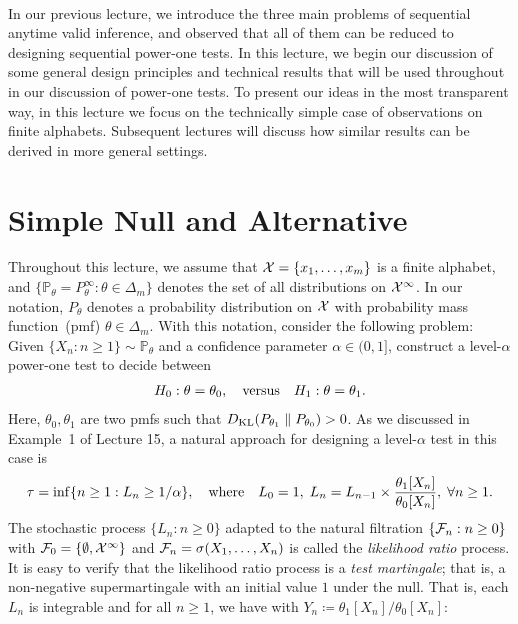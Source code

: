 \documentclass[12pt]{article}
\begin{document}
	\MakeScribeTop
{} \\
In our previous lecture, we introduce the three main problems of sequential anytime valid inference, and observed that all of them can  be reduced to designing sequential power-one tests. In this lecture, we begin our discussion of some general design principles and technical results that will be used throughout in our discussion of power-one tests. To present our ideas in the most transparent way, in this lecture we focus on the technically simple case of \iid observations on finite alphabets. Subsequent lectures will discuss how similar results can be derived in more general settings. 


\section{Simple Null and Alternative}
Throughout this lecture, we assume that ${\cal X} = \{x_1, \ldots, x_m\}$ is a finite alphabet, and $\{\mathbb{P}_\theta = P_\theta^{\infty}:\theta \in \Delta_m\}$ denotes the set of all \iid distributions on ${\cal X}^\infty$. In our notation, $P_\theta$ denotes a probability distribution on ${\cal X}$ with probability mass function~(pmf) $\theta \in \Delta_m$. With this notation, consider the following problem: Given $\{X_n: n\geq 1\} \sim \mathbb{P}_\theta$ and a confidence parameter $\alpha \in (0, 1]$, construct a level-$\alpha$ power-one test to decide between 
\begin{align}
    H_0: \theta = \theta_0, \quad \text{versus} \quad H_1: \theta = \theta_1. 
\end{align}
Here, $\theta_0, \theta_1$ are two pmfs such that $D_{\text{KL}}(P_{\theta_1} \parallel P_{\theta_0}) > 0$.  As we discussed in Example~1 of Lecture 15, a natural approach for designing a level-$\alpha$ test in this case is 
\begin{align}
    \tau = \inf \{n \geq 1: L_n \geq 1/\alpha\}, \quad \text{where} \quad L_0=1, \; L_n = L_{n-1} \times \frac{\theta_1[X_n]}{\theta_0[X_n]}, \; \forall n\geq 1. 
\end{align}
The stochastic process $\{L_n: n \geq 0\}$ adapted to the natural filtration $\{{\cal F}_n: n \geq 0\}$ with ${\cal F}_0 = \{\emptyset, {\cal X}^\infty\}$ and ${\cal F}_n = \sigma(X_1, \ldots, X_n)$ is called the \emph{likelihood ratio} process. It is easy to verify that the likelihood ratio process is a \emph{test martingale}; that is, a non-negative supermartingale with an initial value $1$ under the null. That is, each $L_n$ is integrable and for all $n \geq 1$, we have with $Y_n \coloneqq \theta_1[X_n]/\theta_0[X_n]$: 
\end{document}
